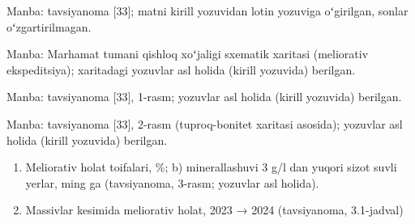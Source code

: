 Manba: tavsiyanoma {[}33{]}; matni kirill yozuvidan lotin yozuviga
oʻgirilgan, sonlar oʻzgartirilmagan.




Manba: Marhamat tumani qishloq xoʻjaligi sxematik xaritasi (meliorativ
ekspeditsiya); xaritadagi yozuvlar asl holida (kirill yozuvida)
berilgan.




Manba: tavsiyanoma {[}33{]}, 1-rasm; yozuvlar asl holida (kirill
yozuvida) berilgan.




Manba: tavsiyanoma {[}33{]}, 2-rasm (tuproq-bonitet xaritasi asosida);
yozuvlar asl holida (kirill yozuvida) berilgan.




\begin{enumerate}
\def\labelenumi{\alph{enumi})}
\item
  Meliorativ holat toifalari, \%; b) minerallashuvi 3 g/l dan yuqori
  sizot suvli yerlar, ming ga (tavsiyanoma, 3-rasm; yozuvlar asl
  holida).
\item
  Massivlar kesimida meliorativ holat, 2023 → 2024 (tavsiyanoma,
  3.1-jadval)
\end{enumerate}

